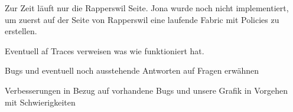 Zur Zeit läuft nur die Rapperswil Seite. Jona wurde noch nicht implementiert, um zuerst auf der Seite von Rapperswil eine laufende Fabric mit Policies zu erstellen.

Eventuell af Traces verweisen was wie funktioniert hat.

Bugs und eventuell noch ausstehende Antworten auf Fragen erwähnen

Verbesserungen in Bezug auf vorhandene Bugs und unsere Grafik in Vorgehen mit Schwierigkeiten

